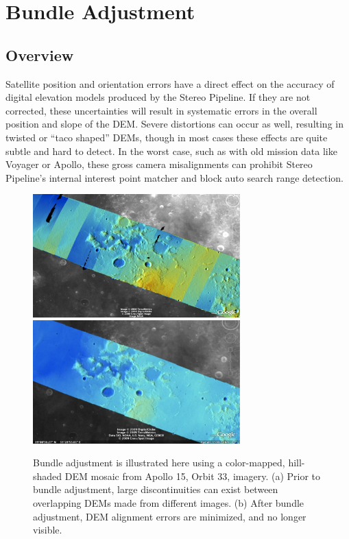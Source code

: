 \chapter{Bundle Adjustment}
\label{ch:bundle_adjustment}

\section{Overview}

\newenvironment{myindentpar}[1]
               {\begin{list}{}
                   {\setlength{\leftmargin}{#1}}
                 \item[]
               }
               {\end{list}}


Satellite position and orientation errors have a direct effect on the
accuracy of digital elevation models produced by the Stereo Pipeline.
If they are not corrected, these uncertainties will result in
systematic errors in the overall position and slope of the \ac{DEM}.
Severe distortions can occur as well, resulting in twisted or ``taco
shaped'' \acp{DEM}, though in most cases these effects are quite
subtle and hard to detect. In the worst case, such as with old mission
data like Voyager or Apollo, these gross camera misalignments can
prohibit Stereo Pipeline's internal interest point matcher and block
auto search range detection.
\begin{figure}[bt]
  \centering
  \includegraphics[width=8cm]{images/ba_orig}
  \includegraphics[width=8cm]{images/ba_adjusted}
  \caption{Bundle adjustment is illustrated here using a color-mapped,
    hill-shaded DEM mosaic from Apollo 15, Orbit 33, imagery. (a)
    Prior to bundle adjustment, large discontinuities can exist between
    overlapping DEMs made from different images. (b) After bundle
    adjustment, DEM alignment errors are minimized, and no longer visible.}
  \label{fig:bundle_adjustment}
\end{figure}

